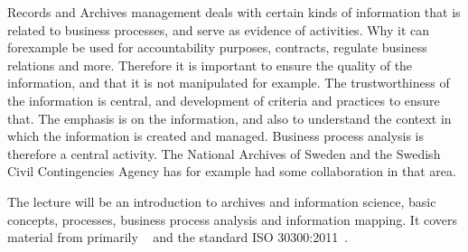Records and Archives management deals with certain kinds of information that is 
related to business processes, and serve as evidence of activities.
Why it can forexample be used for accountability purposes, contracts, regulate 
business relations and more.
Therefore it is important to ensure the quality of the information, and that it 
is not manipulated for example.
The trustworthiness of the information is central, and development of criteria 
and practices to ensure that.
The emphasis is on the information, and also to understand the context in which 
the information is created and managed.
Business process analysis is therefore a central activity.
The National Archives of Sweden and the Swedish Civil Contingencies Agency has 
for example had some collaboration in that area.

The lecture will be an introduction to archives and information science, basic 
concepts, processes, business process analysis and information mapping.
It covers material from primarily ~\cite{infokartl} and 
the standard ISO 30300:2011~\cite{ISO30300:2011}.
